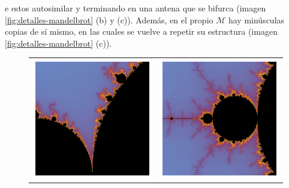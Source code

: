 e estos autosimilar y terminando en una antena que se bifurca (imagen \ref{fig:detalles-mandelbrot} (b) y (c)). Además, en el propio $\mathcal{M}$ hay minúsculas copias de sí mismo, en las cuales se vuelve a repetir su estructura (imagen \ref{fig:detalles-mandelbrot} (c)).

\begin{figure}[ht]
  \centering
  \begin{tabular}{cc}
    \includegraphics[scale=0.4]{./img/C3/mandelbrot-autosimilar-1.png} &   \includegraphics[scale=0.4]{./img/C3/mandelbrot-autosimilar-2.png} \\

\end{tabular}
\end{figure}
